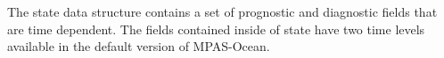 The state data structure contains a set of prognostic and diagnostic fields
that are time dependent. The fields contained inside of state have two time
levels available in the default version of MPAS-Ocean.
